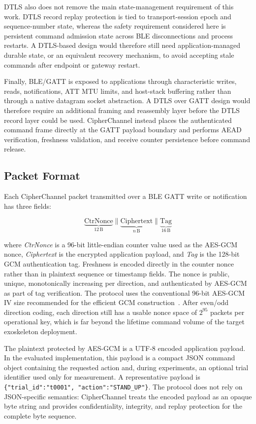 \documentclass[journal]{IEEEtran}
\begin{document}
DTLS also does not remove the main state-management requirement of this work. DTLS record replay protection is tied to transport-session epoch and sequence-number state, whereas the safety requirement considered here is persistent command admission state across BLE disconnections and process restarts. A DTLS-based design would therefore still need application-managed durable state, or an equivalent recovery mechanism, to avoid accepting stale commands after endpoint or gateway restart.

Finally, BLE/GATT is exposed to applications through characteristic writes, reads, notifications, ATT MTU limits, and host-stack buffering rather than through a native datagram socket abstraction. A DTLS over GATT design would therefore require an additional framing and reassembly layer before the DTLS record layer could be used. CipherChannel instead places the authenticated command frame directly at the GATT payload boundary and performs AEAD verification, freshness validation, and receive counter persistence before command release.

\subsection{Packet Format}
\label{sec:packetformat}

Each CipherChannel packet transmitted over a BLE GATT write or notification has
three fields:

\[
\underbrace{\text{CtrNonce}}_{12\,\text{B}} \parallel
\underbrace{\text{Ciphertext}}_{n\,\text{B}} \parallel
\underbrace{\text{Tag}}_{16\,\text{B}}
\]

\noindent where \emph{CtrNonce} is a 96-bit little-endian counter value used as the AES-GCM nonce, \emph{Ciphertext} is the encrypted application payload, and \emph{Tag} is the 128-bit GCM authentication tag. Freshness is encoded directly in the counter nonce rather than in plaintext sequence or timestamp fields. The nonce is public, unique, monotonically increasing per direction, and authenticated by AES-GCM as part of tag verification. The protocol uses the conventional 96-bit AES-GCM IV size recommended for the efficient GCM construction~\cite{nist_sp800_38d}. After even/odd direction coding, each direction still has a usable nonce space of $2^{95}$ packets per operational key, which is far beyond the lifetime command volume of the target exoskeleton deployment.

The plaintext protected by AES-GCM is a UTF-8 encoded application payload. In the evaluated implementation, this payload is a compact JSON command object containing the requested action and, during experiments, an optional trial identifier used only for measurement. A representative payload is \texttt{\{"trial\_id":"t0001", "action":"STAND\_UP"\}}. The protocol does not rely on JSON-specific semantics: CipherChannel treats the encoded payload as an opaque byte string and provides confidentiality, integrity, and replay protection for the complete byte sequence.
\end{document}
